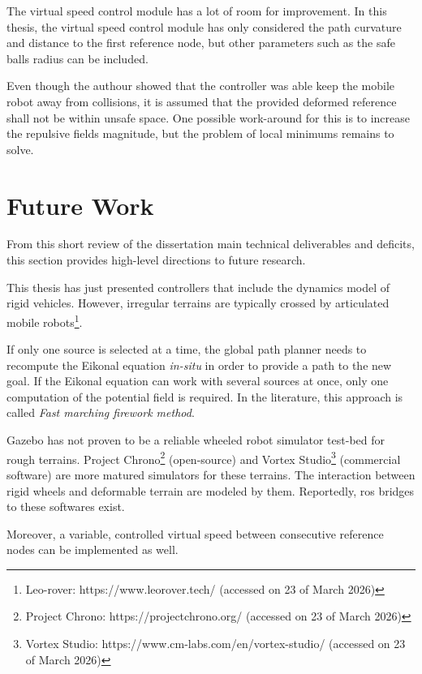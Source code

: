 The virtual speed control module has a lot of room for improvement. In this thesis, the virtual speed control module has only considered the path curvature and distance to the first reference node, but other parameters such as the safe balls radius can be included.

Even though the authour showed that the controller was able keep the mobile robot away from collisions, it is assumed that the provided deformed reference shall not be within unsafe space. One possible work-around for this is to increase the repulsive fields magnitude, but the problem of local minimums remains to solve.

\section{Future Work}
\label{section:future}

From this short review of the dissertation main technical deliverables and deficits, this section provides high-level directions to future research.

This thesis has just presented controllers that include the dynamics model of rigid vehicles. However, irregular terrains are typically crossed by articulated mobile robots\footnote{Leo-rover: https://www.leorover.tech/ (accessed on 23 of March 2026)}.

If only one source is selected at a time, the global path planner needs to recompute the Eikonal equation \textit{in-situ} in order to provide a path to the new goal. If the Eikonal equation can work with several sources at once, only one computation of the potential field is required. In the literature, this approach is called \textit{Fast marching firework method}.

Gazebo has not proven to be a reliable wheeled robot simulator test-bed for rough terrains. Project Chrono\footnote{Project Chrono: https://projectchrono.org/ (accessed on 23 of March 2026)} (open-source) and Vortex Studio\footnote{Vortex Studio: https://www.cm-labs.com/en/vortex-studio/ (accessed on 23 of March 2026)} (commercial software) are more matured simulators for these terrains. The interaction between rigid wheels and deformable terrain are modeled by them. Reportedly, \acrshort{ros} bridges to these softwares exist.

Moreover, a variable, controlled virtual speed between consecutive reference nodes can be implemented as well.

